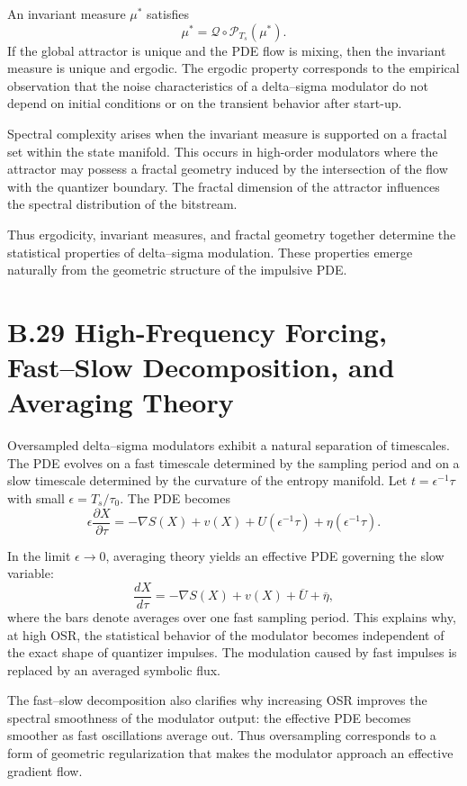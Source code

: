 An invariant measure \(\mu^{\ast}\) satisfies
\[
\mu^{\ast} = \mathcal{Q}\circ \mathcal{P}_{T_{s}} (\mu^{\ast}).
\]
If the global attractor is unique and the PDE flow is mixing, then the invariant measure is unique and ergodic. The ergodic property corresponds to the empirical observation that the noise characteristics of a delta–sigma modulator do not depend on initial conditions or on the transient behavior after start-up.

Spectral complexity arises when the invariant measure is supported on a fractal set within the state manifold. This occurs in high-order modulators where the attractor may possess a fractal geometry induced by the intersection of the flow with the quantizer boundary. The fractal dimension of the attractor influences the spectral distribution of the bitstream.

Thus ergodicity, invariant measures, and fractal geometry together determine the statistical properties of delta–sigma modulation. These properties emerge naturally from the geometric structure of the impulsive PDE.

\section{B.29 High-Frequency Forcing, Fast–Slow Decomposition, and Averaging Theory}

Oversampled delta–sigma modulators exhibit a natural separation of timescales. The PDE evolves on a fast timescale determined by the sampling period and on a slow timescale determined by the curvature of the entropy manifold. Let \(t = \epsilon^{-1}\tau\) with small \(\epsilon = T_{s}/\tau_{0}\). The PDE becomes
\[
\epsilon \frac{\partial X}{\partial \tau} = -\nabla S(X) + v(X) + U(\epsilon^{-1}\tau) + \eta(\epsilon^{-1}\tau).
\]

In the limit \(\epsilon \to 0\), averaging theory yields an effective PDE governing the slow variable:
\[
\frac{dX}{d\tau}
= -\nabla S(X) + v(X) + \overline{U} + \overline{\eta},
\]
where the bars denote averages over one fast sampling period. This explains why, at high OSR, the statistical behavior of the modulator becomes independent of the exact shape of quantizer impulses. The modulation caused by fast impulses is replaced by an averaged symbolic flux.

The fast–slow decomposition also clarifies why increasing OSR improves the spectral smoothness of the modulator output: the effective PDE becomes smoother as fast oscillations average out. Thus oversampling corresponds to a form of geometric regularization that makes the modulator approach an effective gradient flow.

